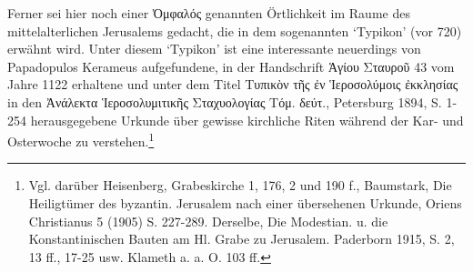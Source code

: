 \documentclass[a4paper, 11pt, oneside]{article}
\begin{document}
Ferner sei hier noch einer Ὀμφαλός genannten Örtlichkeit im Raume des mittelalterlichen Jerusalems gedacht, die in dem sogenannten `Typikon' (vor 720) erwähnt wird. Unter diesem `Typikon' ist eine interessante neuerdings von Papadopulos Kerameus aufgefundene, in der Handschrift Ἁγίου Σταυροῦ 43 vom Jahre 1122 erhaltene und unter dem Titel Τυπικὸν τῆς ἐν Ἱεροσολύμοις ἐκκλησίας in den Ἀνάλεκτα Ἱεροσολυμιτικῆς Σταχυολογίας Τόμ. δεύτ., Petersburg 1894, S. 1-254 herausgegebene Urkunde über gewisse kirchliche Riten während der Kar- und Osterwoche zu verstehen.\footnote{Vgl. darüber Heisenberg, Grabeskirche 1, 176, 2 und 190 f., Baumstark, Die Heiligtümer des byzantin. Jerusalem nach einer übersehenen Urkunde, Oriens Christianus 5 (1905) S. 227-289. Derselbe, Die Modestian. u. die Konstantinischen Bauten am Hl. Grabe zu Jerusalem. Paderborn 1915, S. 2, 13 ff., 17-25 usw. Klameth a. a. O. 103 ff.}
\end{document}
